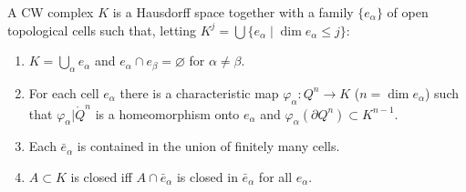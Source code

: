 A CW complex $K$ is a Hausdorff space together with a family $\{e_\alpha\}$ of open topological cells such that, letting $K^j = \bigcup \{e_\alpha \mid \dim e_\alpha \leq j\}$:
\begin{enumerate}
\item[CW 1:] $K = \bigcup_\alpha e_\alpha$ and $e_\alpha \cap e_\beta = \varnothing$ for $\alpha \neq \beta$.
\item[CW 2:] For each cell $e_\alpha$ there is a characteristic map $\varphi_\alpha: Q^n \to K$ ($n = \dim e_\alpha$) such that $\varphi_\alpha|\mathring{Q}^n$ is a homeomorphism onto $e_\alpha$ and $\varphi_\alpha(\partial Q^n) \subset K^{n-1}$.
\item[CW 3:] Each $\bar{e}_\alpha$ is contained in the union of finitely many cells.
\item[CW 4:] $A \subset K$ is closed iff $A \cap \bar{e}_\alpha$ is closed in $\bar{e}_\alpha$ for all $e_\alpha$.
\end{enumerate}

